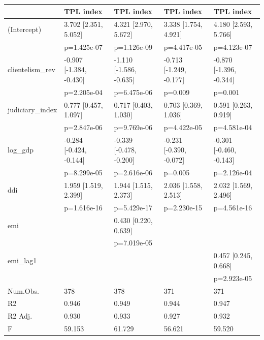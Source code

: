 \begin{tabular}{lllll}
\hline
& TPL index & TPL index  & TPL index   & TPL index    \\ \hline
(Intercept) & 3.702 [2.351, 5.052] & 4.321 [2.970, 5.672] & 3.338 [1.754, 4.921] & 4.180 [2.593, 5.766] \\
& p=1.425e-07 & p=1.126e-09 & p=4.417e-05 & p=4.123e-07 \\
clientelism_rev & -0.907 [-1.384, -0.430] & -1.110 [-1.586, -0.635] & -0.713 [-1.249, -0.177] & -0.870 [-1.396, -0.344] \\
& p=2.205e-04 & p=6.475e-06 & p=0.009 & p=0.001 \\
judiciary_index & 0.777 [0.457, 1.097] & 0.717 [0.403, 1.030] & 0.703 [0.369, 1.036] & 0.591 [0.263, 0.919] \\
& p=2.847e-06 & p=9.769e-06 & p=4.422e-05 & p=4.581e-04 \\
log_gdp & -0.284 [-0.424, -0.144] & -0.339 [-0.478, -0.200] & -0.231 [-0.390, -0.072] & -0.301 [-0.460, -0.143] \\
& p=8.299e-05 & p=2.616e-06 & p=0.005 & p=2.126e-04 \\
ddi & 1.959 [1.519, 2.399] & 1.944 [1.515, 2.373] & 2.036 [1.558, 2.513] & 2.032 [1.569, 2.496] \\
& p=1.616e-16 & p=5.429e-17 & p=2.230e-15 & p=4.561e-16 \\
emi &  & 0.430 [0.220, 0.639] &  &  \\
&  & p=7.019e-05 &  &  \\
emi_lag1 &  &  &  & 0.457 [0.245, 0.668] \\
&  &  &  & p=2.923e-05 \\
Num.Obs. & 378 & 378 & 371 & 371 \\
R2 & 0.946 & 0.949 & 0.944 & 0.947 \\
R2 Adj. & 0.930 & 0.933 & 0.927 & 0.932 \\
F & 59.153 & 61.729 & 56.621 & 59.520 \\
\hline
\end{tabular}
